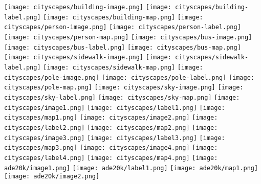\documentclass[10pt,twocolumn,letterpaper]{article}
\begin{document}
\begin{figure*}[htb]
\centering
\texttt{[image: cityscapes/building-image.png]}
\texttt{[image: cityscapes/building-label.png]}
\texttt{[image: cityscapes/building-map.png]}
\texttt{[image: cityscapes/person-image.png]}
\texttt{[image: cityscapes/person-label.png]}
\texttt{[image: cityscapes/person-map.png]}
\vspace{.05cm}
\texttt{[image: cityscapes/bus-image.png]}
\texttt{[image: cityscapes/bus-label.png]}
\texttt{[image: cityscapes/bus-map.png]}
\texttt{[image: cityscapes/sidewalk-image.png]}
\texttt{[image: cityscapes/sidewalk-label.png]}
\texttt{[image: cityscapes/sidewalk-map.png]}
\vspace{.05cm}
\texttt{[image: cityscapes/pole-image.png]}
\texttt{[image: cityscapes/pole-label.png]}
\texttt{[image: cityscapes/pole-map.png]}
\texttt{[image: cityscapes/sky-image.png]}
\texttt{[image: cityscapes/sky-label.png]}
\texttt{[image: cityscapes/sky-map.png]}
\vspace{.05cm}
\texttt{[image: cityscapes/image1.png]}
\texttt{[image: cityscapes/label1.png]}
\texttt{[image: cityscapes/map1.png]}
\texttt{[image: cityscapes/image2.png]}
\texttt{[image: cityscapes/label2.png]}
\texttt{[image: cityscapes/map2.png]}
\vspace{.05cm}
\texttt{[image: cityscapes/image3.png]}
\texttt{[image: cityscapes/label3.png]}
\texttt{[image: cityscapes/map3.png]}
\texttt{[image: cityscapes/image4.png]}
\texttt{[image: cityscapes/label4.png]}
\texttt{[image: cityscapes/map4.png]}
\vspace{.05cm}
\texttt{[image: ade20k/image1.png]}
\texttt{[image: ade20k/label1.png]}
\texttt{[image: ade20k/map1.png]}
\texttt{[image: ade20k/image2.png]}

\end{figure*}
\end{document}
